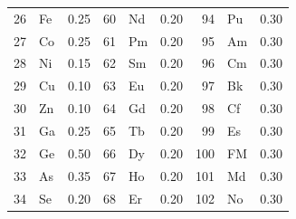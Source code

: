 \documentclass[12pt]{article}
\begin{document}
\begin{center}
\begin{tabular}{|r|l|c||r|l|c||r|l|c|}
26 & Fe  & 0.25  & 60 & Nd  & 0.20 &  94 & Pu  & 0.30 \\
27 & Co  & 0.25  & 61 & Pm  & 0.20 &  95 & Am  & 0.30 \\
28 & Ni  & 0.15  & 62 & Sm  & 0.20 &  96 & Cm  & 0.30 \\
29 & Cu  & 0.10  & 63 & Eu  & 0.20 &  97 & Bk  & 0.30 \\
30 & Zn  & 0.10  & 64 & Gd  & 0.20 &  98 & Cf  & 0.30 \\
31 & Ga  & 0.25  & 65 & Tb  & 0.20 &  99 & Es  & 0.30 \\
32 & Ge  & 0.50  & 66 & Dy  & 0.20 & 100 & FM  & 0.30 \\
33 & As  & 0.35  & 67 & Ho  & 0.20 & 101 & Md  & 0.30 \\
34 & Se  & 0.20  & 68 & Er  & 0.20 & 102 & No  & 0.30 \\
\hline
\end{tabular}
\end{center}



\newpage

\begin{small} %



\end{small}

\end{document}
